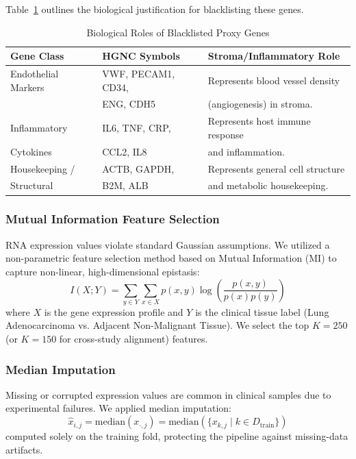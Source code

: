 \documentclass[journal,10pt]{IEEEtran}
\begin{document}
Table~\ref{tab:blacklist_genes} outlines the biological justification for blacklisting these genes.

\begin{table}[htbp]
\centering
\caption{Biological Roles of Blacklisted Proxy Genes}
\label{tab:blacklist_genes}
\begin{tabular}{lll}
\toprule
\textbf{Gene Class} & \textbf{HGNC Symbols} & \textbf{Stroma/Inflammatory Role} \\
\midrule
Endothelial Markers & VWF, PECAM1, CD34, & Represents blood vessel density \\
                    & ENG, CDH5          & (angiogenesis) in stroma. \\
\midrule
Inflammatory        & IL6, TNF, CRP,     & Represents host immune response \\
Cytokines           & CCL2, IL8          & and inflammation. \\
\midrule
Housekeeping /      & ACTB, GAPDH,       & Represents general cell structure \\
Structural          & B2M, ALB           & and metabolic housekeeping. \\
\bottomrule
\end{tabular}
\end{table}

\subsubsection{Mutual Information Feature Selection}
RNA expression values violate standard Gaussian assumptions. We utilized a non-parametric feature selection method based on Mutual Information (MI) to capture non-linear, high-dimensional epistasis:
\begin{equation}
I(X;Y) = \sum_{y \in Y} \sum_{x \in X} p(x,y) \log \left( \frac{p(x,y)}{p(x)p(y)} \right)
\end{equation}
where $X$ is the gene expression profile and $Y$ is the clinical tissue label (Lung Adenocarcinoma vs. Adjacent Non-Malignant Tissue). We select the top $K=250$ (or $K=150$ for cross-study alignment) features.

\subsubsection{Median Imputation}
Missing or corrupted expression values are common in clinical samples due to experimental failures. We applied median imputation:
\begin{equation}
\hat{x}_{i,j} = \text{median}(x_{\cdot, j}) = \text{median}(\{x_{k,j} \mid k \in D_{\text{train}}\})
\end{equation}
computed solely on the training fold, protecting the pipeline against missing-data artifacts.
\end{document}
